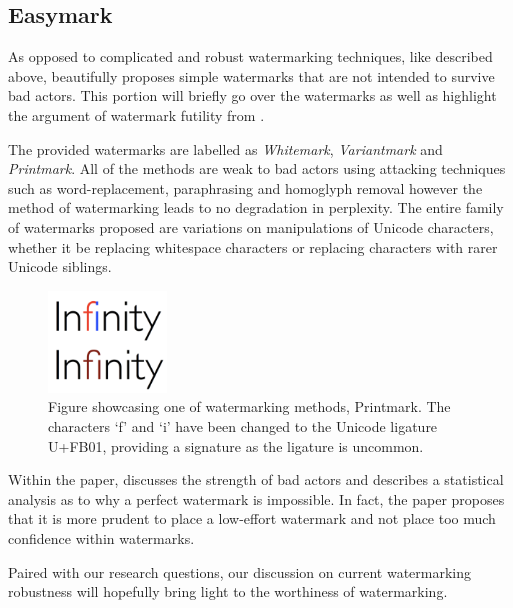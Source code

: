 \documentclass{l4proj}
\theoremstyle{definition}
\begin{document}
    \subsection{Easymark}
        \label{sec:easymark}
        As opposed to complicated and robust watermarking techniques, like described above, \citet{sato2023embarrassingly} beautifully proposes simple watermarks that are not intended to survive bad actors. This portion will briefly go over the watermarks as well as highlight the argument of watermark futility from \citet{sato2023embarrassingly}.

        The provided watermarks are labelled as \emph{Whitemark}, \emph{Variantmark} and \emph{Printmark}. All of the methods are weak to bad actors using attacking techniques such as word-replacement, paraphrasing and homoglyph removal however the method of watermarking leads to no degradation in perplexity. The entire family of watermarks proposed are variations on manipulations of Unicode characters, whether it be replacing whitespace characters or replacing characters with rarer Unicode siblings.

        \begin{figure}[ht]
            \centering
            \includegraphics[width=1\linewidth, height=2.7cm, keepaspectratio]{images/background/inf-ligature.png}
            \caption{Figure showcasing one of watermarking methods, Printmark. The characters `f' and `i' have been changed to the Unicode ligature U+FB01, providing a signature as the ligature is uncommon.}
            \label{fig:fi-ligature}
            \nocite{infinity-ligatures-pict}
        \end{figure}

        Within the paper, \citet{sato2023embarrassingly} discusses the strength of bad actors and describes a statistical analysis as to why a perfect watermark is impossible. In fact, the paper proposes that it is more prudent to place a low-effort watermark and not place too much confidence within watermarks. 

        Paired with our research questions, our discussion on current watermarking robustness will hopefully bring light to the worthiness of watermarking. 
\end{document}
